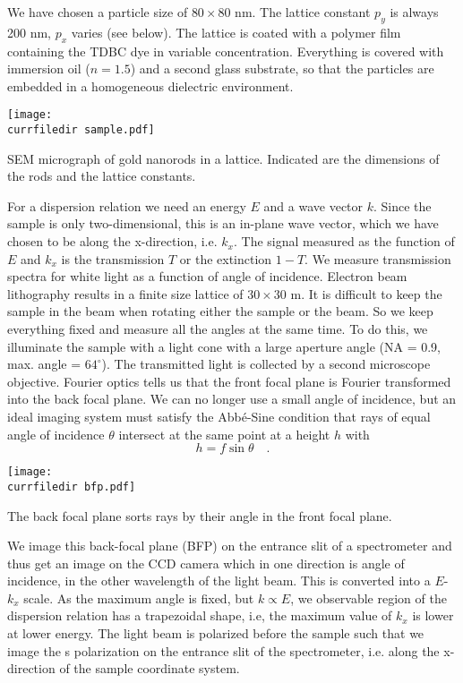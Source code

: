 We have chosen a particle size of $80 \times 80$ nm. The lattice constant $p_y$ is always 200 nm, $p_x$ varies (see below). The lattice is coated with a polymer film containing the TDBC dye in variable concentration. Everything is covered with immersion oil ($n=1.5$) and a second glass substrate, so that the particles are embedded in a homogeneous dielectric environment.


\begin{marginfigure}
\texttt{[image: \\currfiledir sample.pdf]}
\caption{SEM micrograph of gold nanorods in a lattice. Indicated are the dimensions of the rods and the lattice constants.}
\end{marginfigure}


For a dispersion relation we need an energy $E$ and a wave vector $k$. Since the sample is only two-dimensional, this is an in-plane wave vector, which we have chosen to be along the x-direction, i.e. $k_x$. The signal measured as the function of $E$ and $k_x$ is the transmission $T$ or the extinction $1-T$.
We measure transmission spectra for white light as a function of angle of incidence. Electron beam lithography results in a finite size lattice of $30 \times 30$ \textmu m. It is difficult to keep the sample in the beam when rotating either the sample or the beam. So we keep everything fixed and measure all the angles at the same time. To do this, we illuminate the sample with a light cone with a large aperture angle (NA = 0.9, max. angle = $64^\circ$). The transmitted light is collected by a second microscope objective. Fourier optics tells us that the front focal plane is Fourier transformed into the back focal plane. We can no longer use a small angle of incidence, but an ideal imaging system must satisfy the Abbé-Sine condition that rays of equal angle of incidence $\theta$ intersect at the same point at a height $h$ with
\begin{equation}
 h = f \sin \theta \quad .
\end{equation}

\begin{marginfigure}
\texttt{[image: \\currfiledir bfp.pdf]}
\caption{The back focal plane sorts rays by their angle in the front focal plane.}
\end{marginfigure}

We image this back-focal plane (BFP) on the entrance slit of a spectrometer and thus get an image on the CCD camera which in one direction is angle of incidence, in the other wavelength of the light beam. This is converted into a $E$-$k_x$ scale. As the maximum angle is fixed, but $k \propto E$, we observable region of the dispersion relation has a trapezoidal shape, i.e, the maximum value of $k_x$ is lower at lower energy. The light beam is polarized before the sample such that we image the s polarization on the entrance slit of the spectrometer, i.e. along the x-direction of the sample coordinate system.


